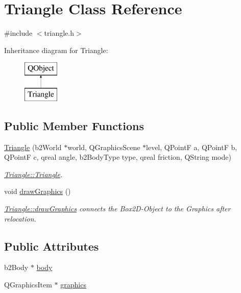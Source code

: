 \hypertarget{class_triangle}{}\section{Triangle Class Reference}
\label{class_triangle}


{\ttfamily \#include $<$triangle.\+h$>$}

Inheritance diagram for Triangle\+:\begin{figure}[H]
\begin{center}
\leavevmode
\includegraphics[height=2.000000cm]{class_triangle}
\end{center}
\end{figure}
\subsection*{Public Member Functions}
\begin{DoxyCompactItemize}
\item 
\hyperlink{class_triangle_a47f2b3f39a014d432f7a42d84f443370}{Triangle} (b2\+World $\ast$world, Q\+Graphics\+Scene $\ast$level, Q\+PointF a, Q\+PointF b, Q\+PointF c, qreal angle, b2\+Body\+Type type, qreal friction, Q\+String mode)
\begin{DoxyCompactList}\small\item\em \hyperlink{class_triangle_a47f2b3f39a014d432f7a42d84f443370}{Triangle\+::\+Triangle}. \end{DoxyCompactList}\item 
void \hyperlink{class_triangle_a37c8163fef65a3979e7cc8b076db936c}{draw\+Graphics} ()
\begin{DoxyCompactList}\small\item\em \hyperlink{class_triangle_a37c8163fef65a3979e7cc8b076db936c}{Triangle\+::draw\+Graphics} connects the Box2\+D-\/\+Object to the Graphics after relocation. \end{DoxyCompactList}\end{DoxyCompactItemize}
\subsection*{Public Attributes}
\begin{DoxyCompactItemize}
\item 
b2\+Body $\ast$ \hyperlink{class_triangle_a342320abc2a212d7f6a86a262ac438b6}{body}
\item 
Q\+Graphics\+Item $\ast$ \hyperlink{class_triangle_a914fac6f6bdac1dd191f82f5a5443646}{graphics}
\end{DoxyCompactItemize}



